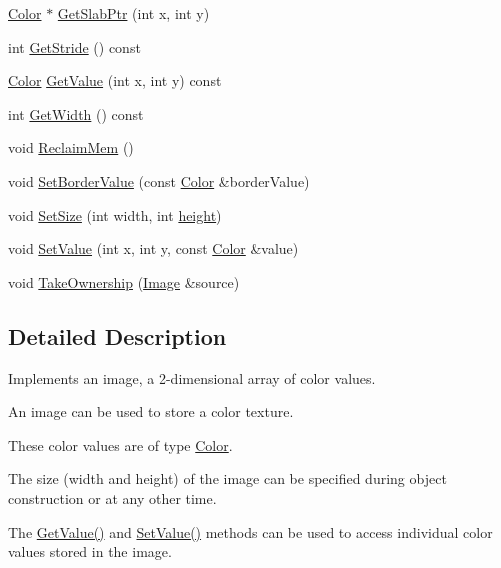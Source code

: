 \begin{DoxyCompactItemize}
\hyperlink{classnoise_1_1utils_1_1_color}{Color} $\ast$ \hyperlink{classnoise_1_1utils_1_1_image_a4bb9044274076ae580f817a3324d17f9}{Get\+Slab\+Ptr} (int x, int y)
\item 
int \hyperlink{classnoise_1_1utils_1_1_image_aae765a3fe9f3f15b87ef9340f3ceddb0}{Get\+Stride} () const 
\item 
\hyperlink{classnoise_1_1utils_1_1_color}{Color} \hyperlink{classnoise_1_1utils_1_1_image_a6bf57386c71a907949db2e9137b98867}{Get\+Value} (int x, int y) const 
\item 
int \hyperlink{classnoise_1_1utils_1_1_image_a64ff551a36ab982be8cfbe2cd6c4d23d}{Get\+Width} () const 
\item 
void \hyperlink{classnoise_1_1utils_1_1_image_a06ff018a46972fa2c4791b7d4487ecfd}{Reclaim\+Mem} ()
\item 
void \hyperlink{classnoise_1_1utils_1_1_image_a5ce5f632933cf6b38a3971c1ead5e186}{Set\+Border\+Value} (const \hyperlink{classnoise_1_1utils_1_1_color}{Color} \&border\+Value)
\item 
void \hyperlink{classnoise_1_1utils_1_1_image_a7ffcbbd684c749dc4e0ae6f25ae9499f}{Set\+Size} (int width, int \hyperlink{_examples_2_bezier_2_app_8cpp_a48083b65ac9a863566dc3e3fff09a5b4}{height})
\item 
void \hyperlink{classnoise_1_1utils_1_1_image_abaf072381b96ec4c22cbdd555ba3ad5e}{Set\+Value} (int x, int y, const \hyperlink{classnoise_1_1utils_1_1_color}{Color} \&value)
\item 
void \hyperlink{classnoise_1_1utils_1_1_image_a73eb07f81fd07f00c4251e8dce5483af}{Take\+Ownership} (\hyperlink{classnoise_1_1utils_1_1_image}{Image} \&source)
\end{DoxyCompactItemize}


\subsection{Detailed Description}
Implements an image, a 2-\/dimensional array of color values.

An image can be used to store a color texture.

These color values are of type \hyperlink{classnoise_1_1utils_1_1_color}{Color}.

The size (width and height) of the image can be specified during object construction or at any other time.

The \hyperlink{classnoise_1_1utils_1_1_image_ab923c8098c27b51ac1aa2a79a324f6f8}{Get\+Value()} and \hyperlink{classnoise_1_1utils_1_1_image_ac99e2764bf63c6fa1fc2c4bec459d049}{Set\+Value()} methods can be used to access individual color values stored in the image.

